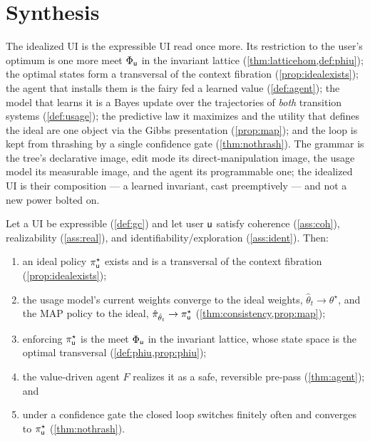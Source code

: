 \documentclass[../uxoxo-main]{subfiles}
\begin{document}
\section{Synthesis}\label{iu:synth}
The idealized UI is the expressible UI read once more. Its restriction to the
user's optimum is one more meet $\Phi_{\mathsf{u}}$ in the invariant lattice
(\cref{thm:latticehom,def:phiu}); the optimal states form a transversal of the
context fibration (\cref{prop:idealexists}); the agent that installs them is the
fairy fed a learned value (\cref{def:agent}); the model that learns it is a Bayes
update over the trajectories of \emph{both} transition systems
(\cref{def:usage}); the predictive law it maximizes and the utility that defines
the ideal are one object via the Gibbs presentation (\cref{prop:map}); and the
loop is kept from thrashing by a single confidence gate (\cref{thm:nothrash}).
The grammar is the tree's declarative image, edit mode its direct-manipulation
image, the usage model its measurable image, and the agent its programmable one;
the idealized UI is their composition --- a learned invariant, cast preemptively
--- and not a new power bolted on.

\begin{theorem}\label{thm:assembled}
Let a UI be expressible (\cref{def:gc}) and let user $\mathsf{u}$ satisfy coherence
(\cref{ass:coh}), realizability (\cref{ass:real}), and
identifiability/exploration (\cref{ass:ident}). Then:
\begin{enumerate}[label=\textup{(\arabic*)}, leftmargin=*, itemsep=1pt]
  \item an ideal policy $\pi^\star_{\mathsf{u}}$ exists and is a transversal of the
        context fibration (\cref{prop:idealexists});
  \item the usage model's current weights converge to the ideal weights,
        $\hat\theta_t\to\theta^\star$, and the MAP policy to the ideal,
        $\hat\pi_{\hat\theta_t}\to\pi^\star_{\mathsf{u}}$ (\cref{thm:consistency,prop:map});
  \item enforcing $\pi^\star_{\mathsf{u}}$ is the meet $\Phi_{\mathsf{u}}$ in the invariant lattice,
        whose state space is the optimal transversal (\cref{def:phiu,prop:phiu});
  \item the value-driven agent $F$ realizes it as a safe, reversible pre-pass
        (\cref{thm:agent}); and
  \item under a confidence gate the closed loop switches finitely often and
        converges to $\pi^\star_{\mathsf{u}}$ (\cref{thm:nothrash}).
\end{enumerate}
\end{theorem}
\end{document}
